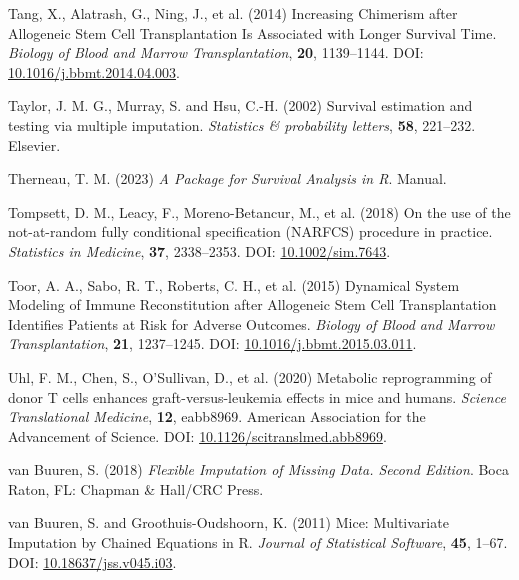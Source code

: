 \documentclass[
  letterpaper,
  paper=240mm:170mm,
  twoside=true,
  open=right,
  fontsize=10pt,
  pagesize=false,
  BCOR=15mm,
  DIV=14,
  headinclude=true,
  footinclude=false,
  headsepline=on]{scrbook}
\newlength{\cslhangindent}
\newenvironment{CSLReferences}[2] %
 {\begin{list}{}{%
  \setlength{\itemindent}{0pt}
  \setlength{\leftmargin}{0pt}
  \setlength{\parsep}{0pt}
  \ifodd #1
   \setlength{\leftmargin}{\cslhangindent}
   \setlength{\itemindent}{-1\cslhangindent}
  \fi
  \setlength{\itemsep}{#2\baselineskip}}}
 {\end{list}}
\begin{document}
\begin{CSLReferences}{1}{1}
Tang, X., Alatrash, G., Ning, J., et al. (2014) Increasing {Chimerism}
after {Allogeneic Stem Cell Transplantation Is Associated} with {Longer
Survival Time}. \emph{Biology of Blood and Marrow Transplantation},
\textbf{20}, 1139--1144. DOI:
\href{https://doi.org/10.1016/j.bbmt.2014.04.003}{10.1016/j.bbmt.2014.04.003}.

Taylor, J. M. G., Murray, S. and Hsu, C.-H. (2002) Survival estimation
and testing via multiple imputation. \emph{Statistics \& probability
letters}, \textbf{58}, 221--232. Elsevier.

Therneau, T. M. (2023) \emph{A Package for Survival Analysis in {R}}.
Manual.

Tompsett, D. M., Leacy, F., Moreno-Betancur, M., et al. (2018) On the
use of the not-at-random fully conditional specification ({NARFCS})
procedure in practice. \emph{Statistics in Medicine}, \textbf{37},
2338--2353. DOI:
\href{https://doi.org/10.1002/sim.7643}{10.1002/sim.7643}.

Toor, A. A., Sabo, R. T., Roberts, C. H., et al. (2015) Dynamical
{System Modeling} of {Immune Reconstitution} after {Allogeneic Stem Cell
Transplantation Identifies Patients} at {Risk} for {Adverse Outcomes}.
\emph{Biology of Blood and Marrow Transplantation}, \textbf{21},
1237--1245. DOI:
\href{https://doi.org/10.1016/j.bbmt.2015.03.011}{10.1016/j.bbmt.2015.03.011}.

Uhl, F. M., Chen, S., O'Sullivan, D., et al. (2020) Metabolic
reprogramming of donor {T} cells enhances graft-versus-leukemia effects
in mice and humans. \emph{Science Translational Medicine}, \textbf{12},
eabb8969. American Association for the Advancement of Science. DOI:
\href{https://doi.org/10.1126/scitranslmed.abb8969}{10.1126/scitranslmed.abb8969}.

van Buuren, S. (2018) \emph{Flexible Imputation of Missing Data.
{Second} Edition}. Boca Raton, FL: Chapman \& Hall/CRC Press.

van Buuren, S. and Groothuis-Oudshoorn, K. (2011) Mice: {Multivariate
Imputation} by {Chained Equations} in {R}. \emph{Journal of Statistical
Software}, \textbf{45}, 1--67. DOI:
\href{https://doi.org/10.18637/jss.v045.i03}{10.18637/jss.v045.i03}.


\end{CSLReferences}
\end{document}
